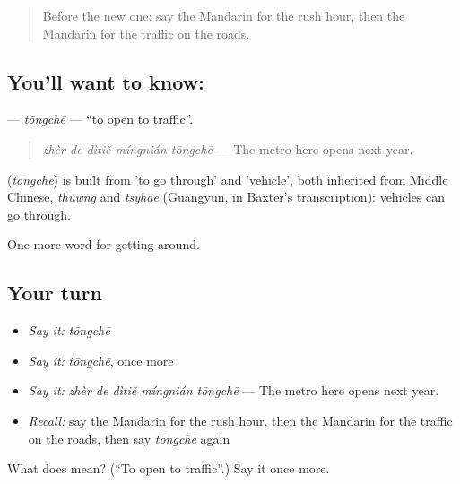 \label{lesson:ZH-C409-tongche}



\begin{quote}
Before the new one: say the Mandarin for the rush hour, then the Mandarin for the traffic on the roads.
\end{quote}

\subsection*{You'll want to know: }
\textbf{} — \emph{tōngchē} — \textquotedblleft{}to open to traffic\textquotedblright{}.

\begin{quote}
\emph{zhèr de dìtiě míngnián tōngchē} — The metro here opens next year.
\end{quote}

\begin{cousinweb}
\textbf{} (\emph{tōngchē}) is built from  'to go through' and  'vehicle', both inherited from Middle Chinese, \emph{thuwng} and \emph{tsyhae} (Guangyun, in Baxter's transcription): vehicles can go through.
\end{cousinweb}

\begin{grammarlens}[title={What you've built}]
One more word for getting around.
\end{grammarlens}

\subsection*{Your turn}
\begin{itemize}
\raggedright
  \item \emph{Say it:} \emph{tōngchē}
  \item \emph{Say it:} \emph{tōngchē}, once more
  \item \emph{Say it:} \emph{zhèr de dìtiě míngnián tōngchē} — The metro here opens next year.
  \item \emph{Recall:} say the Mandarin for the rush hour, then the Mandarin for the traffic on the roads, then say \emph{tōngchē} again
\end{itemize}

\begin{tcolorbox}[breakable,colback=teal!4,colframe=teal!35!black,title={Before you move on}]
What does  mean? (\textquotedblleft{}To open to traffic\textquotedblright{}.) Say it once more.
\end{tcolorbox}
